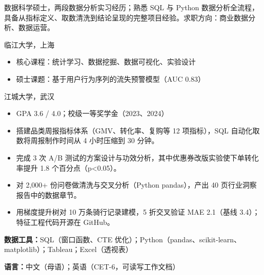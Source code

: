 \documentclass{common/resume-zh}
\begin{document}

数据科学硕士，两段数据分析实习经历；熟悉 SQL 与 Python 数据分析全流程，具备从指标定义、取数清洗到结论呈现的完整项目经验。求职方向：商业数据分析、数据运营。

临江大学，上海
\begin{itemize}
  \item 核心课程：统计学习、数据挖掘、数据可视化、实验设计
  \item 硕士课题：基于用户行为序列的流失预警模型（AUC 0.83）
\end{itemize}
江城大学，武汉
\begin{itemize}
  \item GPA 3.6 / 4.0；校级一等奖学金（2023、2024）
\end{itemize}

\begin{itemize}
  \item 搭建品类周报指标体系（GMV、转化率、复购等 12 项指标），SQL 自动化取数将周报制作时间从 4 小时压缩到 30 分钟。
  \item 完成 3 次 A/B 测试的方案设计与功效分析，其中优惠券改版实验使下单转化率提升 1.8 个百分点（p<0.05）。
\end{itemize}
\begin{itemize}
  \item 对 2,000+ 份问卷做清洗与交叉分析（Python pandas），产出 40 页行业洞察报告中的数据章节。
\end{itemize}

\begin{itemize}
  \item 用梯度提升树对 10 万条骑行记录建模，5 折交叉验证 MAE 2.1（基线 3.4）；特征工程代码开源在 GitHub。
\end{itemize}

\textbf{数据工具：}SQL（窗口函数、CTE 优化）；Python（pandas、scikit-learn、matplotlib）；Tableau；Excel（透视表）\par
\textbf{语言：}中文（母语）；英语（CET-6，可读写工作文档）
\end{document}
